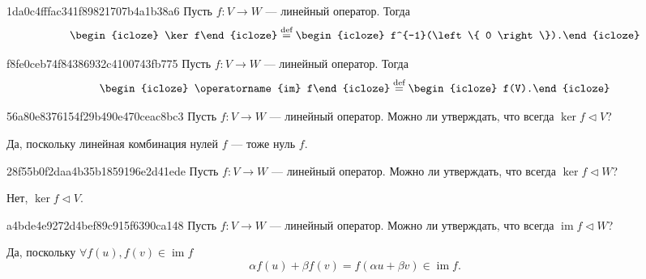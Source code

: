 \begin{note}{1da0c4fffac341f89821707b4a1b38a6}
    Пусть \( f : V \to W \) --- линейный оператор. Тогда
    \[
        \begin{icloze}{2}\ker f\end{icloze} \overset{\text{def}}= \begin{icloze}{1}f^{-1}(\left\{ 0 \right\}).\end{icloze}
    \]
\end{note}

\begin{note}{f8fe0ceb74f84386932c4100743fb775}
    Пусть \( f : V \to W \) --- линейный оператор. Тогда
    \[
        \begin{icloze}{2}\operatorname{im} f\end{icloze} \overset{\text{def}}= \begin{icloze}{1}f(V).\end{icloze}
    \]
\end{note}

\begin{note}{56a80e8376154f29b490e470ceac8bc3}
    Пусть \( f : V \to W \) --- линейный оператор. Можно ли утверждать, что всегда \( \ker f \triangleleft V \)?

    \begin{cloze}{1}
        Да, поскольку линейная комбинация нулей \( f \) --- тоже нуль \( f \).
    \end{cloze}
\end{note}

\begin{note}{28f55b0f2daa4b35b1859196e2d41ede}
    Пусть \( f : V \to W \) --- линейный оператор. Можно ли утверждать, что всегда \( \ker f \triangleleft W \)?

    \begin{cloze}{1}
        Нет, \( \ker f \triangleleft V \).
    \end{cloze}
\end{note}

\begin{note}{a4bde4e9272d4bef89c915f6390ca148}
    Пусть \( f : V \to W \) --- линейный оператор. Можно ли утверждать, что всегда \( \operatorname{im} f \triangleleft W \)?

    \begin{cloze}{1}
        Да, поскольку \( \forall f(u), f(v) \in \operatorname{im} f \)
        \[
            \alpha f(u) + \beta f(v) = f(\alpha u + \beta v) \in \operatorname{im} f.
        \]
    \end{cloze}
\end{note}


